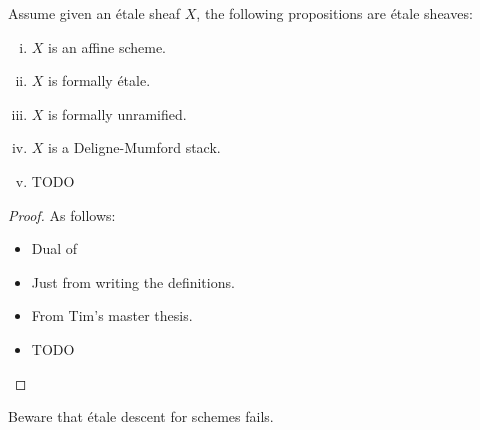 \begin{proposition}\label{types-all-descent}
Assume given an \'etale sheaf $X$, the following propositions are \'etale sheaves:
\begin{enumerate}[(i)]
\item $X$ is an affine scheme.
\item $X$ is formally \'etale.
\item $X$ is formally unramified.
\item $X$ is a Deligne-Mumford stack.
\item TODO
\end{enumerate}
\end{proposition}

\begin{proof}
As follows:
\begin{itemize}
\item[(i)] Dual of 
\item[(ii,iii)] Just from writing the definitions.
\item[(iv)] From Tim's master thesis.
\item TODO
\end{itemize}
\end{proof}

\begin{remark}
Beware that \'etale descent for schemes fails.
\end{remark}





